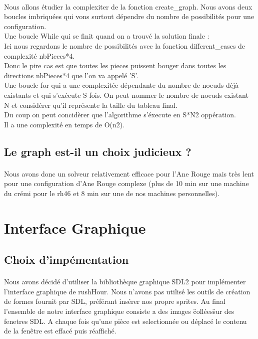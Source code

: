 \documentclass {article}
\begin{document}
\paragraph{}
Nous allons étudier la complexiter de la fonction create\_graph. Nous avons deux boucles imbriquées qui vons surtout dépendre du nombre de possibilités pour une configuration.\\
Une boucle While qui se finit quand on a trouvé la solution finale :\\
Ici nous regardons le nombre de possibilités avec la fonction different\_cases de complexité nbPieces*4.\\
Donc le pire cas est que toutes les pieces puissent bouger dans toutes les directions nbPieces*4 que l'on va appelé 'S'.\\
Une boucle for qui a une complexitée dépendante du nombre de noeuds déjà existants et qui s'exécute S fois. On peut nommer le nombre de noeuds existant N et considérer qu'il représente la taille du tableau final.\\
Du coup on peut concidèrer que l'algorithme s'éxecute en S*N2 oppération.\\
Il a une complexité en temps de O(n2).


\subsection{Le graph est-il un choix judicieux ?}
\paragraph{}
Nous avons donc un solveur relativement efficace pour l'Ane Rouge mais très lent pour une configuration d'Ane Rouge complexe (plus de 10 min sur une machine du crémi pour le rh46 et 8 min sur une de nos machines personnelles).

\section{Interface Graphique}
\subsection{Choix d'impémentation}
\paragraph{}
Nous avons décidé d'utiliser la bibliothèque graphique SDL2 pour implémenter l'interface graphique de rushHour. Nous n'avons pas utilisé les outils de création de formes fournit par SDL, préférant insérer nos propre sprites. Au final l'ensemble de notre interface graphique consiste a des images \"collées\" sur des fenetres SDL. A chaque fois qu'une pièce est selectionnée ou déplacé le contenu de la fenêtre est effacé puis réaffiché.
\end{document}
